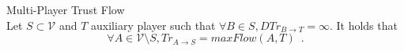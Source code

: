 {}
\begin{theoremgr}{Multi-Player Trust Flow} \ \\
  \label{trustmany}
  Let $S \subset \mathcal{V}$ and $T$ auxiliary player such that $\forall B \in S, DTr_{B \rightarrow T} = \infty$.
  It holds that
  \begin{equation*}
    \forall A \in \mathcal{V} \setminus S, Tr_{A \rightarrow S} = maxFlow\left(A, T\right) \enspace.
  \end{equation*}
\end{theoremgr}       
